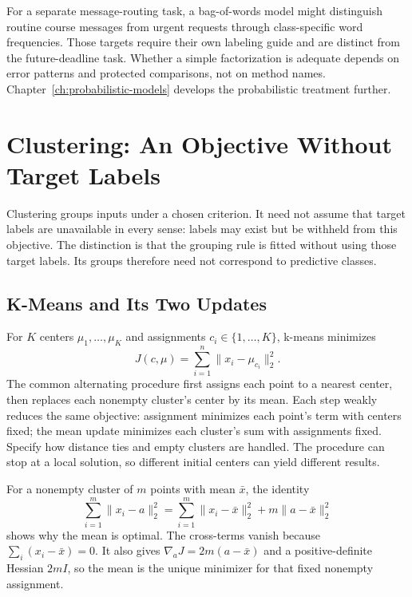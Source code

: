For a separate message-routing task, a bag-of-words model might distinguish routine course messages from urgent requests through class-specific word frequencies. Those targets require their own labeling guide and are distinct from the future-deadline task. Whether a simple factorization is adequate depends on error patterns and protected comparisons, not on method names. Chapter~\ref{ch:probabilistic-models} develops the probabilistic treatment further.

\section{Clustering: An Objective Without Target Labels}

Clustering groups inputs under a chosen criterion. It need not assume that target labels are unavailable in every sense: labels may exist but be withheld from this objective. The distinction is that the grouping rule is fitted without using those target labels. Its groups therefore need not correspond to predictive classes.

\subsection{K-Means and Its Two Updates}

For $K$ centers $\mu_1,\ldots,\mu_K$ and assignments $c_i\in\{1,\ldots,K\}$, k-means minimizes
\[
J(c,\mu)=\sum_{i=1}^n\|x_i-\mu_{c_i}\|_2^2.
\]
The common alternating procedure first assigns each point to a nearest center, then replaces each nonempty cluster's center by its mean. Each step weakly reduces the same objective: assignment minimizes each point's term with centers fixed; the mean update minimizes each cluster's sum with assignments fixed. Specify how distance ties and empty clusters are handled. The procedure can stop at a local solution, so different initial centers can yield different results.

For a nonempty cluster of $m$ points with mean $\bar x$, the identity
\[
\sum_{i=1}^m\|x_i-a\|_2^2
=\sum_{i=1}^m\|x_i-\bar x\|_2^2+m\|a-\bar x\|_2^2
\]
shows why the mean is optimal. The cross-terms vanish because $\sum_i(x_i-\bar x)=0$. It also gives $\nabla_a J=2m(a-\bar x)$ and a positive-definite Hessian $2mI$, so the mean is the unique minimizer for that fixed nonempty assignment.

